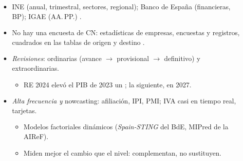 \documentclass{article}
\begin{document}
\begin{columnas}
\begin{itemize}
\item INE (anual, trimestral, sectores, regional); Banco de España (financieras, BP); IGAE (AA.\,PP.) .
\item No hay una encuesta de CN: estadísticas de empresas, encuestas y registros, cuadrados en las tablas de origen y destino .
\item \emph{Revisiones}: ordinarias (avance $\to$ provisional $\to$ definitivo) y extraordinarias.
  \begin{itemize}
  \item RE 2024 elevó el PIB de 2023 un ; la siguiente, en 2027.
  \end{itemize}
\item \emph{Alta frecuencia y} nowcasting: afiliación, IPI, PMI; IVA casi en tiempo real, tarjetas.
  \begin{itemize}
  \item Modelos factoriales dinámicos (\emph{Spain-STING} del BdE, MIPred de la AIReF).
  \item Miden mejor el cambio que el nivel: complementan, no sustituyen.
  \end{itemize}
\end{itemize}


\end{columnas}
\end{document}
